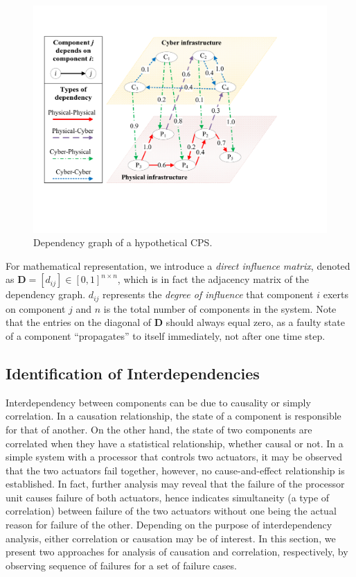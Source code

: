 \documentclass[12pt]{elsarticle}
\begin{document}
\begin{figure}
\centering
\includegraphics[width=0.70\columnwidth]{sample_dep_graph}
\caption{Dependency graph of a hypothetical CPS.}
\label{fig:sample_dep_graph}
\end{figure}

For mathematical representation, we introduce a \emph{direct influence matrix}, denoted as $\mathbf{D} = \left[d_{ij}\right] \in [0, 1]^{n \times n}$, which is in fact the adjacency matrix of the dependency graph. $d_{ij}$ represents the \emph{degree of influence} that component $i$ exerts on component $j$ and $n$ is the total number of components in the system. Note that the entries on the diagonal of $\mathbf{D}$ should always equal zero, as a faulty state of a component ``propagates'' to itself immediately, not after one time step.

\subsection{Identification of Interdependencies}
\label{sec:analysis:iden}
Interdependency between components can be due to causality or simply correlation. In a causation relationship, the state of a component is responsible for that of another. On the other hand, the state of two components are correlated when they have a statistical relationship, whether causal or not. In a simple system with a processor that controls two actuators, it may be observed that the two actuators fail together, however, no cause-and-effect relationship is established. In fact, further analysis may reveal that the failure of the processor unit causes failure of both actuators, hence indicates simultaneity (a type of correlation) between failure of the two actuators without one being the actual reason for failure of the other. Depending on the purpose of interdependency analysis, either correlation or causation may be of interest. In this section, we present two approaches for analysis of causation and correlation, respectively, by observing sequence of failures for a set of failure cases.
\end{document}

